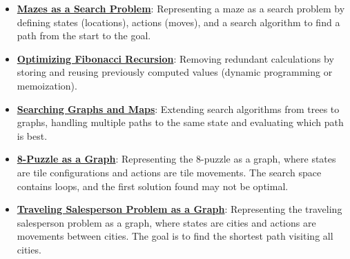 \documentclass{article}%
\begin{document}
\begin{itemize}[leftmargin=*]
\item \href{https://purdue.brightspace.com/d2l/common/assets/pdfjs-d2l-dist/1.0.14-legacy/web/viewer.html?file=\%2Fcontent\%2Fenforced\%2F1095467-wl.202510.CS.24300.001\%2F14L1-DepthFS.pdf\%3Fou\%3D1095467\&lang=en-us\&container=d2l-fileviewer-rendered-pdf\&fullscreen=d2l-fileviewer-rendered-pdf-dialog\&height=667#page=16}{\textbf{Mazes as a Search Problem}}: Representing a maze as a search problem by defining states (locations), actions (moves), and a search algorithm to find a path from the start to the goal.%
\item \href{https://purdue.brightspace.com/d2l/common/assets/pdfjs-d2l-dist/1.0.14-legacy/web/viewer.html?file=\%2Fcontent\%2Fenforced\%2F1095467-wl.202510.CS.24300.001\%2F14L1-DepthFS.pdf\%3Fou\%3D1095467\&lang=en-us\&container=d2l-fileviewer-rendered-pdf\&fullscreen=d2l-fileviewer-rendered-pdf-dialog\&height=667#page=21}{\textbf{Optimizing Fibonacci Recursion}}: Removing redundant calculations by storing and reusing previously computed values (dynamic programming or memoization).%
\item \href{https://purdue.brightspace.com/d2l/common/assets/pdfjs-d2l-dist/1.0.14-legacy/web/viewer.html?file=\%2Fcontent\%2Fenforced\%2F1095467-wl.202510.CS.24300.001\%2F14L1-DepthFS.pdf\%3Fou\%3D1095467\&lang=en-us\&container=d2l-fileviewer-rendered-pdf\&fullscreen=d2l-fileviewer-rendered-pdf-dialog\&height=667#page=25}{\textbf{Searching Graphs and Maps}}: Extending search algorithms from trees to graphs, handling multiple paths to the same state and evaluating which path is best.%
\item \href{https://purdue.brightspace.com/d2l/common/assets/pdfjs-d2l-dist/1.0.14-legacy/web/viewer.html?file=\%2Fcontent\%2Fenforced\%2F1095467-wl.202510.CS.24300.001\%2F14L1-DepthFS.pdf\%3Fou\%3D1095467\&lang=en-us\&container=d2l-fileviewer-rendered-pdf\&fullscreen=d2l-fileviewer-rendered-pdf-dialog\&height=667#page=29}{\textbf{8{-}Puzzle as a Graph}}: Representing the 8-puzzle as a graph, where states are tile configurations and actions are tile movements. The search space contains loops, and the first solution found may not be optimal.%
\item \href{https://purdue.brightspace.com/d2l/common/assets/pdfjs-d2l-dist/1.0.14-legacy/web/viewer.html?file=\%2Fcontent\%2Fenforced\%2F1095467-wl.202510.CS.24300.001\%2F14L1-DepthFS.pdf\%3Fou\%3D1095467\&lang=en-us\&container=d2l-fileviewer-rendered-pdf\&fullscreen=d2l-fileviewer-rendered-pdf-dialog\&height=667#page=32}{\textbf{Traveling Salesperson Problem as a Graph}}: Representing the traveling salesperson problem as a graph, where states are cities and actions are movements between cities. The goal is to find the shortest path visiting all cities.%

\end{itemize}
\end{document}
